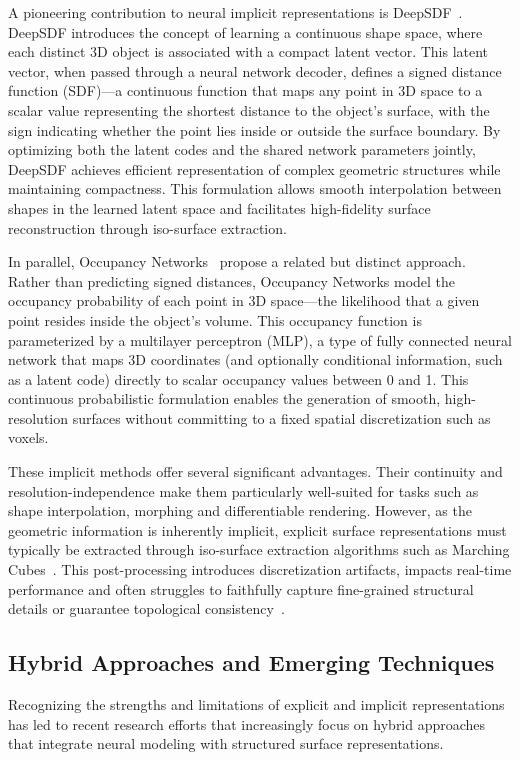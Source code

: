 A pioneering contribution to neural implicit representations is DeepSDF~\cite{Park2019}.
DeepSDF introduces the concept of learning a continuous shape space, where each distinct 3D object is associated with a compact latent vector.
This latent vector, when passed through a neural network decoder, defines a signed distance function (SDF)—a continuous function that maps any point in 3D space to a scalar value representing the shortest distance to the object's surface, with the sign indicating whether the point lies inside or outside the surface boundary.
By optimizing both the latent codes and the shared network parameters jointly, DeepSDF achieves efficient representation of complex geometric structures while maintaining compactness.
This formulation allows smooth interpolation between shapes in the learned latent space and facilitates high-fidelity surface reconstruction through iso-surface extraction.

In parallel, Occupancy Networks~\cite{mescheder2019} propose a related but distinct approach.
Rather than predicting signed distances, Occupancy Networks model the occupancy probability of each point in 3D space—the likelihood that a given point resides inside the object's volume.
This occupancy function is parameterized by a multilayer perceptron (MLP), a type of fully connected neural network that maps 3D coordinates (and optionally conditional information, such as a latent code) directly to scalar occupancy values between 0 and 1.
This continuous probabilistic formulation enables the generation of smooth, high-resolution surfaces without committing to a fixed spatial discretization such as voxels.

These implicit methods offer several significant advantages.
Their continuity and resolution-independence make them particularly well-suited for tasks such as shape interpolation, morphing and differentiable rendering.
However, as the geometric information is inherently implicit, explicit surface representations must typically be extracted through iso-surface extraction algorithms such as Marching Cubes~\cite{lorensen1987}.
This post-processing introduces discretization artifacts, impacts real-time performance and often struggles to faithfully capture fine-grained structural details or guarantee topological consistency~\cite{sitzmann2020}.

\subsection{Hybrid Approaches and Emerging Techniques}
Recognizing the strengths and limitations of explicit and implicit representations has led to recent research efforts that increasingly focus on hybrid approaches that integrate neural modeling with structured surface representations.

